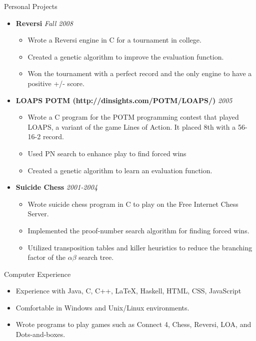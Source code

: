 \documentclass[11pt,oneside]{article}
\newenvironment{ressection}[1]{
	\vspace{4pt}
	{\fontfamily{phv}\selectfont\Large#1}
	\begin{itemize}
	\vspace{3pt}
}{
	\end{itemize}
}
\newcommand{\resitem}[1]{
	\vspace{-4pt}
	\item \begin{flushleft} #1 \end{flushleft}
}
\newcommand{\ressubitem}[1]{
	\vspace{-1pt}
	\item \begin{flushleft} #1 \end{flushleft}
}
\newcommand{\resbigitemb}[2]{
	\vspace{-5pt}
	\item{\textbf{#1} \hfill \textit{#2}}
}
\newenvironment{resdateditem}[2]{
	\resbigitemb{#1}{#2}
	\vspace{-2pt}
	\begin{itemize}
}{
	\end{itemize}
}
\begin{document}
\begin{ressection}{Personal Projects}

  \begin{resdateditem}{Reversi}{Fall 2008}
    \ressubitem{Wrote a Reversi engine in C for a tournament in college.}
		\ressubitem{Created a genetic algorithm to improve the evaluation function.}
		\ressubitem{Won the tournament with a perfect record and the only engine to have a positive +/- score.}
  \end{resdateditem}
	

  \begin{resdateditem}{LOAPS POTM (http://dinsights.com/POTM/LOAPS/)}{2005}
    \ressubitem{Wrote a C program for the POTM programming contest that
    played LOAPS, a variant of the game Lines of Action.  It placed 8th
    with a 56-16-2 record.}
    \ressubitem{Used PN search to enhance play to find forced wins}
    \ressubitem{Created a genetic algorithm to learn an evaluation function.}
  \end{resdateditem}

  \begin{resdateditem}{Suicide Chess}{2001-2004}
    \ressubitem{Wrote suicide chess program in C to play on the Free Internet Chess Server.}
    \ressubitem{Implemented the proof-number search algorithm for finding forced wins.}
    \ressubitem{Utilized transposition tables and killer heuristics to reduce the branching factor of the $\alpha\beta$ search tree.}
  \end{resdateditem}
\end{ressection}

\begin{ressection}{Computer Experience}
  \resitem{Experience with Java, C, C++, \LaTeX, Haskell, HTML, CSS, JavaScript}
  \resitem{Comfortable in Windows and Unix/Linux environments.}
  \resitem{Wrote programs to play games such as Connect 4, Chess, Reversi, LOA, and Dots-and-boxes.}
\end{ressection}
\end{document}
